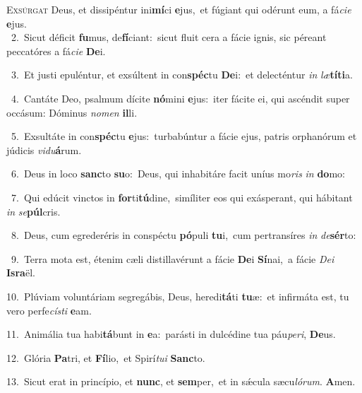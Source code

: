 \lettrine{\initial\textcolor{\initialcolor}{E}}{xsúrgat} Deus, et dissipéntur ini\-\textbf{mí}\-ci \textbf{e}\-jus,~\star et fúgiant qui odérunt eum, a fá\-\textit{ci}\-\textit{e} \textbf{e}\-jus.\\
{\numbfont\textcolor{\numbcolor}{~2.}}~Sicut déficit \textbf{fu}\-mus, de\-\textbf{fí}\-ciant:~\star sicut fluit cera a fácie ignis, sic péreant peccatóres a fá\-\textit{ci}\-\textit{e} \textbf{De}\-i.\par
{\numbfont\textcolor{\numbcolor}{~3.}}~Et justi epuléntur, et exsúltent in con\-\textbf{spéc}\-tu \textbf{De}\-i:~\star et delecténtur \textit{in} \textit{læ}\-\textbf{tí}\textbf{ti}a.\par
{\numbfont\textcolor{\numbcolor}{~4.}}~Cantáte Deo, psalmum dícite \textbf{nó}\-mini \textbf{e}\-jus:~\star iter fácite ei, qui ascéndit super occásum: Dóminus \textit{no}\-\textit{men} \textbf{il}\-li.\par
{\numbfont\textcolor{\numbcolor}{~5.}}~Exsultáte in con\-\textbf{spéc}\-tu \textbf{e}\-jus:~\star turbabúntur a fácie ejus, patris orphanórum et júdicis \textit{vi}\-\textit{du}\textbf{á}rum.\par
{\numbfont\textcolor{\numbcolor}{~6.}}~Deus in loco \textbf{sanc}\-to \textbf{su}\-o:~\star Deus, qui inhabitáre facit uníus mo\textit{ris} \textit{in} \textbf{do}\-mo:\par
{\numbfont\textcolor{\numbcolor}{~7.}}~Qui edúcit vinctos in \textbf{for}\-ti\-\textbf{tú}\-dine,~\star simíliter eos qui exásperant, qui hábitant \textit{in} \textit{se}\-\textbf{púl}cris.\par
{\numbfont\textcolor{\numbcolor}{~8.}}~Deus, cum egrederéris in conspéctu \textbf{pó}\-puli \textbf{tu}\-i,~\star cum pertransíres \textit{in} \textit{de}\-\textbf{sér}to:\par
{\numbfont\textcolor{\numbcolor}{~9.}}~Terra mota est, étenim cæli distillavérunt a fácie \textbf{De}\-i \textbf{Sí}\-nai,~\star a fácie \textit{De}\-\textit{i} \textbf{Is}\-\textbf{ra}ël.\par
{\numbfont\textcolor{\numbcolor}{10.}}~Plúviam voluntáriam segregábis, Deus, heredi\-\textbf{tá}\-ti \textbf{tu}\-æ:~\star et infirmáta est, tu vero perfe\-\textit{cís}\-\textit{ti} \textbf{e}\-am.\par
{\numbfont\textcolor{\numbcolor}{11.}}~Animália tua habi\-\textbf{tá}\-bunt in \textbf{e}\-a:~\star parásti in dulcédine tua páu\-\textit{pe}\-\textit{ri}, \textbf{De}\-us.\par
{\numbfont\textcolor{\numbcolor}{12.}}~Glória \textbf{Pa}\-tri, et \textbf{Fí}\-lio,~\star et Spirí\-\textit{tu}\-\textit{i} \textbf{Sanc}\-to.\par
{\numbfont\textcolor{\numbcolor}{13.}}~Sicut erat in princípio, et \textbf{nunc}\-, et \textbf{sem}\-per,~\star et in sǽcula sæcu\-\textit{ló}\-\textit{rum}. \textbf{A}\-men.\par
